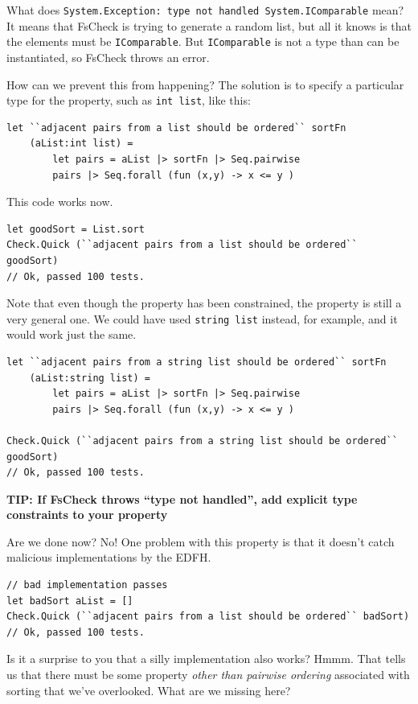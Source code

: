 What does
\texttt{System.Exception:\ type\ not\ handled\ System.IComparable} mean?
It means that FsCheck is trying to generate a random list, but all it
knows is that the elements must be \texttt{IComparable}. But
\texttt{IComparable} is not a type than can be instantiated, so FsCheck
throws an error.

How can we prevent this from happening? The solution is to specify a
particular type for the property, such as \texttt{int\ list}, like this:

\begin{verbatim}
let ``adjacent pairs from a list should be ordered`` sortFn 
    (aList:int list) = 
        let pairs = aList |> sortFn |> Seq.pairwise
        pairs |> Seq.forall (fun (x,y) -> x <= y )
\end{verbatim}
This code works now.

\begin{verbatim}
let goodSort = List.sort
Check.Quick (``adjacent pairs from a list should be ordered`` goodSort)
// Ok, passed 100 tests.
\end{verbatim}
Note that even though the property has been constrained, the property is
still a very general one. We could have used \texttt{string\ list}
instead, for example, and it would work just the same.

\begin{verbatim}
let ``adjacent pairs from a string list should be ordered`` sortFn 
    (aList:string list) = 
        let pairs = aList |> sortFn |> Seq.pairwise
        pairs |> Seq.forall (fun (x,y) -> x <= y )

Check.Quick (``adjacent pairs from a string list should be ordered`` goodSort)
// Ok, passed 100 tests.
\end{verbatim}
\textbf{TIP: If FsCheck throws ``type not handled'', add explicit type
constraints to your property}

Are we done now? No! One problem with this property is that it doesn't
catch malicious implementations by the EDFH.

\begin{verbatim}
// bad implementation passes
let badSort aList = []
Check.Quick (``adjacent pairs from a list should be ordered`` badSort)
// Ok, passed 100 tests.
\end{verbatim}
Is it a surprise to you that a silly implementation also works?
Hmmm. That tells us that there must be some property \emph{other than
pairwise ordering} associated with sorting that we've overlooked. What
are we missing here?

